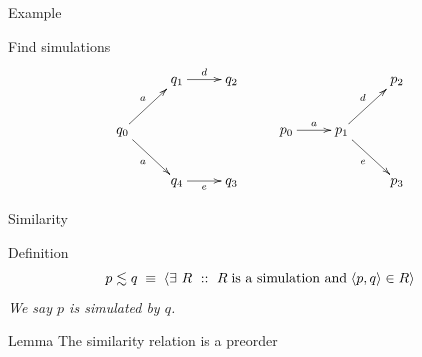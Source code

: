 \documentclass[aspectratio=169]{beamer}
\begin{document}
\begin{slide}{Example}

\begin{exampleblock}{\exercise Find simulations}
\begin{equation*}
\xymatrix{
& q_1  \ar[r]^{d} & q_2 &       &        &                              p_2\\
q_0 \ar[ru]^{a} \ar[rd]_{a} &  & & p_0 \ar[r]^{a} & p_1 \ar[ru]^{d} \ar[rd]_{e} & \\
& q_4  \ar[r]_{e} & q_3 &       &        &                              p_3\\
}
\end{equation*}
\end{exampleblock}

\vspace{0.2cm}
\visible<2->{\exerciseBack\begin{equation*}
q_0 \lesssim p_0 \text{\hspace{0.5cm} cf. \hspace{0.3cm}} 
\enset{\pair{q_0,p_0}, \pair{q_1,p_1},\pair{q_4,p_1},\alert{\ldots}} %
\end{equation*}}
\end{slide}

\exerciseAdd


\begin{slide}{Similarity}
\small

\begin{block}{Definition}
\centering
\[p \lesssim q\; \equiv\; \rcb{\exists}{R}{}{R\; \text{is a simulation and}\; \pair{p,q} \in R} 
\]
\emph{We say \alert{$p$ is simulated by $q$}.}
\end{block}


\begin{block}{Lemma}
The similarity relation is a preorder\\
\end{block}
\end{slide}
\end{document}
